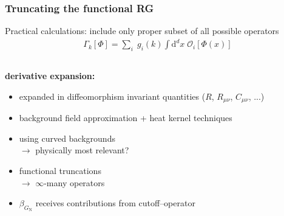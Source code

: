 \documentclass[]{beamer}  %
\newcommand\GNewton{ G_{\scriptscriptstyle{\mathrm{N}}}{} }
\begin{document}
\addtocounter{framenumber}{-1}
\begin{frame}
  \frametitle{Truncating the functional RG}

  Practical calculations: include only proper subset of all possible operators
  \begin{align*}
    \boxed{
      \Gamma_k[\Phi] = \sum_i \; g_i(k) \! \int \mathrm d^d x \; \mathcal O_i [\Phi(x)]
    }
  \end{align*}

  \vspace{-15pt}
  \begin{columns}[T]

    \begin{column}{.5\textwidth}
      \begin{center}
        \textbf{derivative expansion:}
        \begin{itemize}
          \item
            expanded in diffeomorphism invariant quantities
            ($R$, $R_{\mu\nu}$, $C_{\mu\nu}$, ...)\\[8pt]
          \item
            background field approximation + heat kernel
            techniques\\[8pt]
          \item
            using curved backgrounds\\
            $\rightarrow$ physically most relevant?\\[8pt]
          \item
            functional truncations\\
            $\rightarrow$ $\infty$-many operators\\[8pt]
          \item
            $\beta_{\GNewton}$ receives contributions
            from cutoff--operator\\[8pt]
        \end{itemize}
      \end{center}
    \end{column}


\end{columns}
\end{frame}
\end{document}
